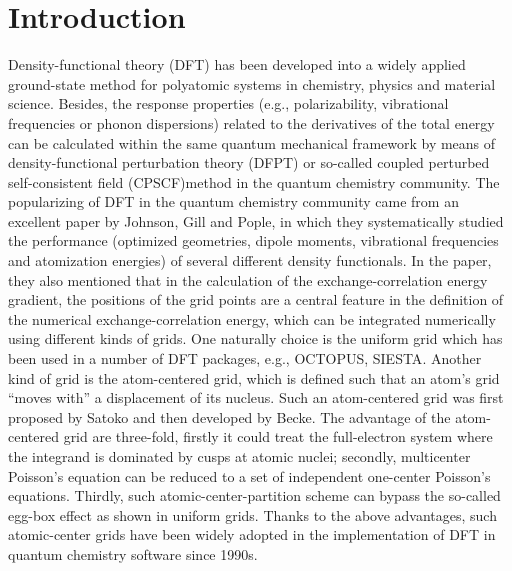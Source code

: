 \documentclass[journal=jpca,manuscript=article]{achemso}
\begin{document}
\section{Introduction}
Density-functional theory (DFT) \cite{Hohenberg1964,Kohn1965} has been developed into a widely applied ground-state method for polyatomic systems in chemistry, physics and material science. Besides, the response properties (e.g., polarizability, vibrational frequencies or phonon
 dispersions) related to the derivatives of the total energy can be calculated within the same quantum mechanical framework by
means of density-functional perturbation theory (DFPT) 
\cite{Gonze1997-1,Gonze1997-2,Baroni-2001} or so-called coupled perturbed 
self-consistent field
(CPSCF)method\cite{Gerratt-1967,Pople-1979,Dykstra-1984,Frisch-1990,
Ochsenfeld-1997, Liang-2005} in the quantum chemistry community. 
The popularizing of DFT in the quantum chemistry community came from an excellent 
paper by Johnson, Gill and Pople\cite{Johnson1993a}, in which they systematically studied the performance (optimized geometries, dipole moments, vibrational frequencies and atomization 
energies) of several different density functionals. In the paper, they also mentioned that in the calculation of the exchange-correlation energy gradient, the positions of the grid points are a central feature in the definition of the numerical exchange-correlation energy, which can be integrated numerically
using different kinds of grids. One naturally choice is the uniform grid 
which has been used in a number of DFT packages, e.g., OCTOPUS\cite{Octopus2015}, SIESTA\cite{Soler2002}. 
Another kind of grid is the atom-centered grid, which is defined such that an atom's grid ``moves with'' a displacement of its nucleus. Such an atom-centered grid was first proposed by Satoko\cite{Satoko1981} and then developed by Becke\cite{Becke1988}.
The advantage of the atom-centered grid are three-fold, firstly it could 
treat the full-electron system where the integrand is dominated by cusps 
at atomic nuclei; secondly, multicenter Poisson's equation can be 
reduced to a set of independent one-center Poisson's equations. 
Thirdly, such atomic-center-partition
scheme can bypass the so-called egg-box effect\cite{Soler2002} as shown in 
uniform grids. Thanks to the above advantages, such atomic-center grids have been widely adopted in the implementation of DFT in quantum chemistry software since 1990s\cite{Delley1991,Johnson1993,Johnson1994}.
\end{document}
